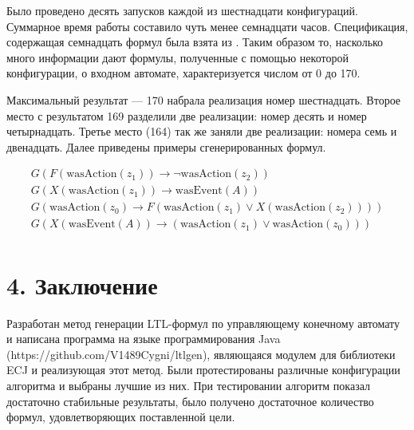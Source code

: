 \documentclass[12pt,fleqn]{article}
\begin{document}
Было проведено десять запусков каждой из шестнадцати конфигураций. Суммарное время работы составило чуть менее семнадцати часов.
Спецификация, содержащая семнадцать формул была взята из \cite{eg}.
Таким образом то, насколько много информации дают формулы, полученные с помощью некоторой конфигурации, о входном автомате,
характеризуется числом от 0 до 170.

Максимальный результат --- 170 набрала реализация номер шестнадцать. Второе место с результатом 169 разделили две реализации:
номер десять и номер четырнадцать. Третье место (164) так же заняли две реализации: номера семь и двенадцать.
Далее приведены примеры сгенерированных формул. 

\begin{multline*}
G(F(\text{wasAction}(z_1)) \rightarrow \lnot \text{wasAction}(z_2))\\
G(X(\text{wasAction}(z_1)) \rightarrow \text{wasEvent}(A))\\
G(\text{wasAction}(z_0) \rightarrow F(\text{wasAction}(z_1) \vee X(\text{wasAction}(z_2))))\\
G(X(\text{wasEvent}(A)) \rightarrow (\text{wasAction}(z_1) \vee \text{wasAction}(z_0)))\\
\end{multline*}

\section{4. Заключение}

Разработан метод генерации LTL-формул по управляющему конечному автомату и написана программа на языке программирования Java
(https://github.com/V1489Cygni/ltlgen), являющаяся модулем для библиотеки ECJ и реализующая этот метод.
Были протестированы различные конфигурации алгоритма и выбраны лучшие из них. При тестировании алгоритм показал
достаточно стабильные результаты, было получено достаточное количество формул, удовлетворяющих поставленной цели.
\end{document}
